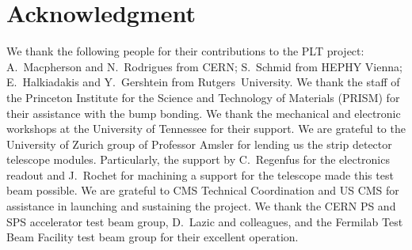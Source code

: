 \documentclass[journal]{IEEEtran}
\begin{document}
\section*{Acknowledgment}
We thank the following people for their contributions 
to the PLT project: A.~Macpherson and N.~Rodrigues from CERN; S.~Schmid from HEPHY Vienna; E.~Halkiadakis and Y.~Gershtein from Rutgers~University.  
We thank the staff of the Princeton Institute for the Science and Technology of Materials (PRISM) for their assistance with the bump bonding.  
We thank the mechanical and electronic workshops at the University of Tennessee for their support.
 We are grateful to the University of Zurich group of Professor Amsler for lending us the strip detector telescope modules. Particularly,
the support by C.~Regenfus for the electronics readout and J.~Rochet for machining a support for the
telescope made this test beam possible. We are grateful to CMS Technical Coordination and US CMS for assistance in launching and sustaining the project.
We thank the CERN PS and SPS accelerator test beam group, D.~Lazic and colleagues, and the Fermilab Test Beam Facility test beam group for their excellent operation.
\end{document}
